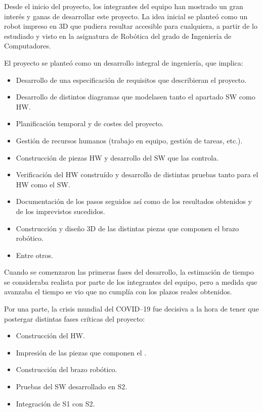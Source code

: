 Desde el inicio del proyecto, los integrantes del equipo han mostrado un gran interés
y ganas de desarrollar este proyecto. La idea inicial se planteó como un robot
impreso en 3D que pudiera resultar accesible para cualquiera, a partir de lo estudiado
y visto en la asignatura de Robótica del grado de Ingeniería de Computadores.

El proyecto se planteó como un desarrollo integral de ingeniería, que implica:
\begin{itemize}
    \item Desarrollo de una especificación de requisitos que describieran el proyecto.
    \item Desarrollo de distintos diagramas que modelasen tanto el apartado
    \ac{SW} como \ac{HW}.
    \item Planificación temporal y de costes del proyecto.
    \item Gestión de recursos humanos (trabajo en equipo, gestión de tareas, etc.).
    \item Construcción de piezas \ac{HW} y desarrollo del \ac{SW} que las controla.
    \item Verificación del \ac{HW} construído y desarrollo de distintas pruebas tanto
    para el \ac{HW} como el \ac{SW}.
    \item Documentación de los pasos seguidos así como de los resultados obtenidos
    y de los imprevistos sucedidos.
    \item Construcción y diseño 3D de las distintas piezas que componen el brazo
    robótico.
    \item Entre otros.
\end{itemize}

Cuando se comenzaron las primeras fases del desarrollo, la estimación de tiempo
se consideraba realista por parte de los integrantes del equipo, pero a medida
que avanzaba el tiempo se vio que no cumplía con los plazos reales obtenidos.

Por una parte, la crisis mundial del COVID--19 fue decisiva a la hora de tener que
postergar distintas fases críticas del proyecto:
\begin{itemize}
    \item Construcción del \ac{HW}.
    \item Impresión de las piezas que componen el \pArm{}.
    \item Construcción del brazo robótico.
    \item Pruebas del \ac{SW} desarrollado en \ac{S2}.
    \item Integración de \ac{S1} con \ac{S2}.
\end{itemize}

